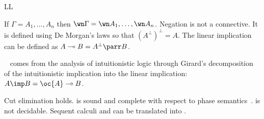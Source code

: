 \begin{entry}{LL}

\begin{clarifications}
If $\Gamma=A_1,\dots,A_n$ then $\wn\Gamma=\wn A_1,\dots,\wn A_n$.
Negation is not a connective. It is defined using De Morgan's laws so that $(A^\bot)^\bot=A$.
The linear implication can be defined as $A\multimap B = A^\bot\parr B$.
\end{clarifications}

\begin{history}
\LL~\cite{ll} comes from the analysis of intuitionistic logic through Girard's decomposition of the intuitionistic implication into the linear implication: $A\imp B = \oc{A}\multimap B$.
\end{history}

\begin{technicalities}
Cut elimination holds.
\LL{} is sound and complete with respect to phase semantics~\cite{ll}.
\LL{} is not decidable.
Sequent calculi \LK{} and \LJ{} can be translated into \LL.
\end{technicalities}



%
%
%
%
%
%
% 
%




\end{entry}
